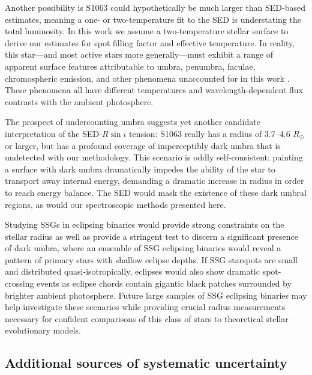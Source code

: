 \documentclass[twocolumn,tighten]{aastex631}
\begin{document}
Another possibility is S1063 could hypothetically be much larger than SED-based estimates, meaning a one- or two-temperature fit to the SED is understating the total luminosity.  In this work we assume a two-temperature stellar surface to derive our estimates for spot filling factor and effective temperature.  In reality, this star---and most active stars more generally---must exhibit a range of apparent surface features attributable to umbra, penumbra, faculae, chromospheric emission, and other phenomena unaccounted for in this work \citep{berdyugina05, 2009A&ARv..17..251S}. These phenomena all have different temperatures and wavelength-dependent flux contrasts with the ambient photosphere. 

The prospect of undercounting umbra suggests yet another candidate interpretation of the SED-$R\sin{i}$ tension: S1063 really has a radius of 3.7--4.6 $R_{\odot}$ or larger, but has a profound coverage of imperceptibly dark umbra that is undetected with our methodology.  This scenario is oddly self-consistent: painting a surface with dark umbra dramatically impedes the ability of the star to transport away internal energy, demanding a dramatic increase in radius in order to reach energy balance.  The SED would mask the existence of these dark umbral regions, as would our spectroscopic methods presented here.  

Studying SSGs in eclipsing binaries would provide strong constraints on the stellar radius as well as provide a stringent test to discern a significant presence of dark umbra, where an ensemble of SSG eclipsing binaries would reveal a pattern of primary stars with shallow eclipse depths.  If SSG starspots are small and distributed quasi-isotropically, eclipses would also show dramatic spot-crossing events as eclipse chords contain gigantic black patches surrounded by brighter ambient photosphere. Future large samples of SSG eclipsing binaries may help investigate these scenarios while providing crucial radius measurements necessary for confident comparisons of this class of stars to theoretical stellar evolutionary models. 



\subsection{Additional sources of systematic uncertainty}
\label{sec:uncertainties}
\end{document}
